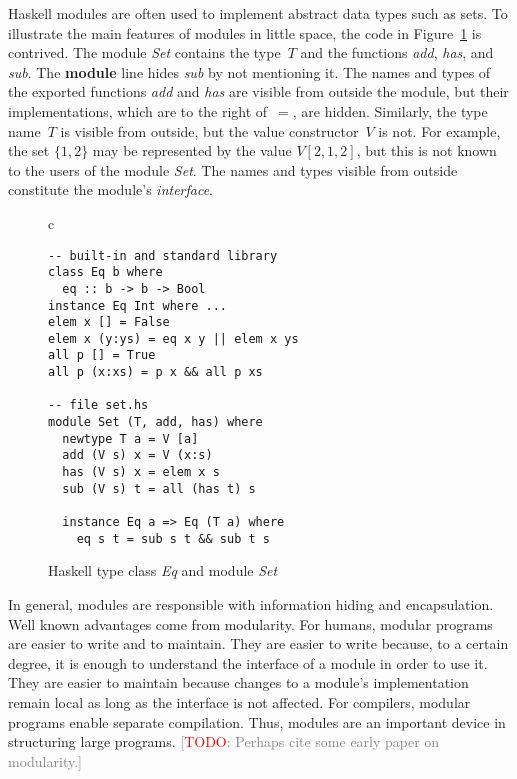 \documentclass[conference,compsoc]{IEEEtran} %
\newcommand{\todo}[1]{{\small \textcolor{gray}{[\textcolor{red}{TODO}: #1]}}}
\begin{document}
Haskell modules are often used to implement abstract data types such as
sets.  To illustrate the main features of modules in little space, the code
in Figure~\ref{fig:haskell} is contrived.  The module \textit{Set} contains
the type~$T$ and the functions \textit{add}, \textit{has}, and
\textit{sub}. The \textbf{module} line hides \textit{sub} by not mentioning
it. The names and types of the exported functions \textit{add} and
\textit{has} are visible from outside the module, but their
implementations, which are to the right of~$=$, are hidden.  Similarly, the
type name~$T$ is visible from outside, but the value constructor~$V$ is
not. For example, the set $\{1,2\}$ may be represented by the value
$V[2,1,2]$, but this is not known to the users of the module \textit{Set}.
The names and types visible from outside constitute the module's
\emph{interface}.

\begin{figure}\footnotesize %
\begin{center}
\begin{tabular}{c}
\begin{lstlisting}[style=hs]
-- built-in and standard library
class Eq b where
  eq :: b -> b -> Bool
instance Eq Int where ...
elem x [] = False
elem x (y:ys) = eq x y || elem x ys
all p [] = True
all p (x:xs) = p x && all p xs

-- file set.hs
module Set (T, add, has) where
  newtype T a = V [a]
  add (V s) x = V (x:s)
  has (V s) x = elem x s
  sub (V s) t = all (has t) s

  instance Eq a => Eq (T a) where
    eq s t = sub s t && sub t s
\end{lstlisting}
\end{tabular}
\end{center}
\caption{Haskell type class \textit{Eq} and module \textit{Set}}
\label{fig:haskell}
\end{figure} %

In general, modules are responsible with information hiding and
encapsulation. Well known advantages come from modularity. For humans,
modular programs are easier to write and to maintain. They are easier to
write because, to a certain degree, it is enough to understand the
interface of a module in order to use it. They are easier to maintain
because changes to a module's implementation remain local as long as the
interface is not affected. For compilers, modular programs enable separate
compilation. Thus, modules are an important device in structuring large
programs. \todo{Perhaps cite some early paper on modularity.}
\end{document}
